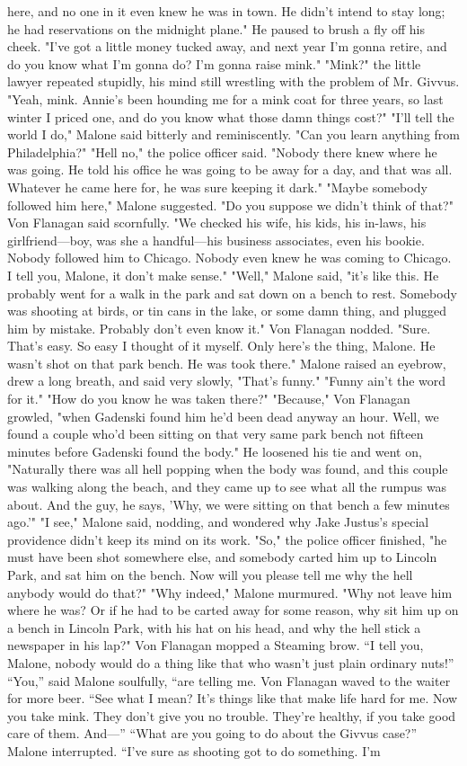 \documentclass{novel}
\begin{document}
here, and no one in it even knew he was in town. He didn't intend to stay long; he had reservations on the midnight plane." He paused to brush a fly off his cheek. "I've got a little money tucked away, and next year I'm gonna retire, and do you know what I'm gonna do? I'm gonna raise mink." "Mink?" the little lawyer repeated stupidly, his mind still wrestling with the problem of Mr. Givvus. "Yeah, mink. Annie's been hounding me for a mink coat for three years, so last winter I priced one, and do you know what those damn things cost?" "I'll tell the world I do," Malone said bitterly and reminiscently. "Can you learn anything from Philadelphia?" "Hell no," the police officer said. "Nobody there knew where he was going. He told his office he was going to be away for a day, and that was all. Whatever he came here for, he was sure keeping it dark." "Maybe somebody followed him here," Malone suggested. "Do you suppose we didn't think of that?" Von Flanagan said scornfully. "We checked his wife, his kids, his in-laws, his girlfriend—boy, was she a handful—his business associates, even his bookie. Nobody followed him to Chicago. Nobody even knew he was coming to Chicago. I tell you, Malone, it don't make sense." "Well," Malone said, "it's like this. He probably went for a walk in the park and sat down on a bench to rest. Somebody was shooting at birds, or tin cans in the lake, or some damn thing, and plugged him by mistake. Probably don't even know it." Von Flanagan nodded. "Sure. That's easy. So easy I thought of it myself. Only here's the thing, Malone. He wasn't shot on that park bench. He was took there." Malone raised an eyebrow, drew a long breath, and said very slowly, "That's funny." "Funny ain't the word for it." "How do you know he was taken there?" "Because," Von Flanagan growled, "when Gadenski found him he'd been dead anyway an hour. Well, we found a couple who'd been sitting on that very same park bench not fifteen minutes before Gadenski found the body." He loosened his tie and went on, "Naturally there was all hell popping when the body was found, and this couple was walking along the beach, and they came up to see what all the rumpus was about. And the guy, he says, 'Why, we were sitting on that bench a few minutes ago.'" "I see," Malone said, nodding, and wondered why Jake Justus's special providence didn't keep its mind on its work. "So," the police officer finished, "he must have been shot somewhere else, and somebody carted him up to Lincoln Park, and sat him on the bench. Now will you please tell me why the hell anybody would do that?" "Why indeed," Malone murmured. "Why not leave him where he was? Or if he had to be carted away for some reason, why sit him up on a bench in Lincoln Park, with his hat on his head, and why the hell stick a newspaper in his lap?" Von Flanagan mopped a Steaming brow. “I tell you, Malone, nobody would do a thing like that who wasn’t just plain ordinary nuts!” “You,” said Malone soulfully, “are telling me. Von Flanagan waved to the waiter for more beer. “See what I mean? It’s things like that make life hard for me. Now you take mink. They don’t give you no trouble. They’re healthy, if you take good care of them. And—” “What are you going to do about the Givvus case?” Malone interrupted. “I’ve sure as shooting got to do something. I’m 
\end{document}
